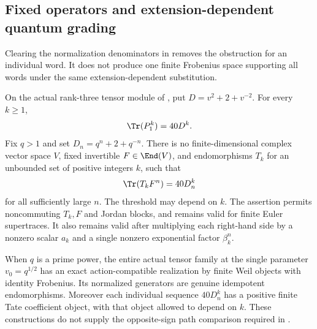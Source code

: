 \subsection{Fixed operators and extension-dependent quantum grading}
Clearing the normalization denominators in  removes
the obstruction for an individual word. It does not produce
one finite Frobenius space supporting all words under the same
extension-dependent substitution.

\begin{finding}\label{f:commonwords}
On the actual rank-three tensor module of , put
$D=v^2+2+v^{-2}$. For every $k\ge1$,
\[
 \Tr(P_1^k)=40D^k.
\]
Fix $q>1$ and set $D_n=q^n+2+q^{-n}$.
There is no finite-dimensional complex vector space $V$,
fixed invertible $F\in\End(V)$, and endomorphisms $T_k$ for
an unbounded set of positive integers $k$, such that
\[
 \Tr(T_kF^n)=40D_n^k
\]
for all sufficiently large $n$. The threshold may depend on $k$.
The assertion permits noncommuting $T_k,F$ and Jordan blocks,
and remains valid for finite Euler supertraces. It also remains
valid after multiplying each right-hand side by a nonzero scalar
$a_k$ and a single nonzero exponential factor $\beta_k^n$.

When $q$ is a prime power, the entire actual tensor family at the single
parameter $v_0=q^{1/2}$ has an exact action-compatible realization
by finite Weil objects with identity Frobenius. Its normalized
generators are genuine idempotent endomorphisms. Moreover each
individual sequence $40D_n^k$ has a positive finite Tate
coefficient object, with that object allowed to depend on $k$.
These constructions do not supply the opposite-sign path
comparison required in .
\end{finding}

